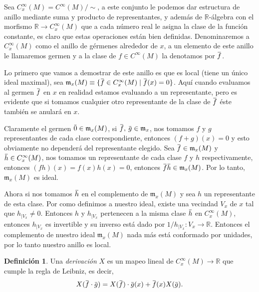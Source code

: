 \documentclass{report}
\theoremstyle{definition}
\newtheorem{defi}[theorem]{Definici\'on}
\newcommand{\overbar}[1]{\mkern 1.5mu\overline{\mkern-1.5mu#1\mkern-1.5mu}\mkern 1.5mu}
\begin{document}
Sea $C^\infty_x (M) = C^\infty (M) / \sim$, a este conjunto le podemos dar estructura de anillo mediante suma y producto de representantes, y adem\'as de $\mathbb{R}$-\'algebra con el morfismo $\mathbb{R} \to C^\infty_x (M)$ que a cada n\'umero real le asigna la clase de la funci\'on constante, es claro que estas operaciones est\'an bien definidas. Denominaremos a $C^\infty_x (M)$ como el anillo de g\'ermenes alrededor de $x$, a un elemento de este anillo le llamaremos germen y a la clase de $f \in C^\infty(M)$ la denotamos por $\overbar{f}$.

Lo primero que vamos a demostrar de este anillo es que es local (tiene un \'unico ideal maximal), sea  $\mathfrak{m}_x (M) \equiv \{ \overbar{f} \in C^\infty_x (M) \mid \overbar{f} (x) = 0 \}$. Aqu\'i cuando evaluamos al germen $\overbar{f}$ en $x$ en realidad estamos evaluando a un representante, pero es evidente que si tomamos cualquier otro representante de la clase de $\overbar{f}$ \'este tambi\'en se anular\'a en $x$.

 Claramente el germen $\overbar{0} \in \mathfrak{m}_x (M)$, si $\overbar{f}, \: \overbar{g} \in \mathfrak{m}_x$, nos tomamos  $f$ y $g$ representantes de cada clase correspondiente, entonces $(f + g)(x) = 0$ y esto obviamente no depender\'a del representante elegido. Sea $\overbar{f} \in \mathfrak{m}_x (M)$ y $\overbar{h} \in C^\infty_x (M)$, nos tomamos un representante de cada clase $f$ y $h$ respectivamente, entonces $(fh)(x) = f (x) h(x) = 0$, entonces $\overbar{f} \overbar{h} \in \mathfrak{m}_x (M)$. Por lo tanto, $\mathfrak{m}_x (M)$ es ideal.
 
 Ahora si nos tomamos $\overbar{h}$ en el complemento de $\mathfrak{m}_x (M)$ y sea $h$ un representante de esta clase. Por como definimos a nuestro ideal, existe una vecindad $V_x$ de $x$ tal que $h_{\vert V_x} \neq 0$. Entonces $h$ y $h_{\vert V_x}$ pertenecen a la misma clase $\overbar{h}$ en $C^\infty_x (M)$, entonces $h_{\vert V_x}$ es invertible y su inverso est\'a dado por $1 / h_{\vert V_x}: V_x \to \mathbb{R}$. Entonces el complemento de nuestro ideal $\mathfrak{m}_x (M)$ nada m\'as est\'a conformado por unidades, por lo tanto nuestro anillo es local.
 
\begin{defi}
 Una \textit{derivaci\'on} $X$ es un mapeo lineal de $C^\infty_x (M) \to \mathbb{R}$ que cumple la regla de Leibniz, es decir, $$X( \overbar{f} \cdot \overbar{g} ) = X( \overbar{f} ) \cdot \overbar{g}(x) + \overbar{f} (x) X (\overbar{g}) .$$
\end{defi}
\end{document}
